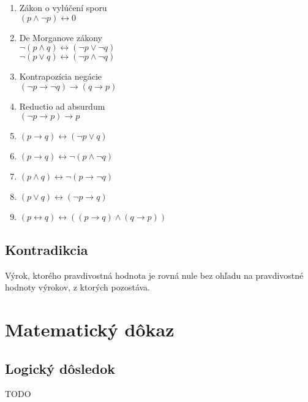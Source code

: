 \begin{enumerate}
    \item Zákon o vylúčení sporu\\
    $( p \wedge \neg  p) \leftrightarrow  0$\\
    \item De Morganove zákony\\
    $\neg ( p \wedge q) \leftrightarrow  ( \neg  p \vee \neg q)$\\
    $\neg ( p \vee q) \leftrightarrow  ( \neg  p \wedge \neg q)$\\
    \item Kontrapozícia negácie\\
    $(\neg p \rightarrow \neg q) \rightarrow ( q \rightarrow p)$\\
    \item Reductio ad absurdum\\
    $(\neg p \rightarrow p) \rightarrow p$\\
    \item $( p \rightarrow q) \leftrightarrow  ( \neg  p \vee q)$\\
    \item $( p \rightarrow q) \leftrightarrow  \neg ( p \wedge \neg q)$\\
    \item $( p \wedge q) \leftrightarrow  \neg ( p \rightarrow \neg q)$\\
    \item $( p \vee q) \leftrightarrow ( \neg  p \rightarrow q)$\\
    \item $( p \leftrightarrow  q) \leftrightarrow  (( p \rightarrow q) \wedge ( q \rightarrow p))$\\
    \end{enumerate}


  \subsection{Kontradikcia}
  Výrok, ktorého pravdivostná hodnota je rovná nule bez ohľadu na pravdivostné hodnoty výrokov, z ktorých pozostáva.


\section{Matematický dôkaz}

  \subsection{Logický dôsledok}
	TODO
